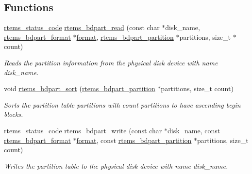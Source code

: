 \subsection*{Functions}
\begin{DoxyCompactItemize}
\item 
\mbox{\hyperlink{group__ClassicStatus_ga545d41846817eaba6143d52ee4d9e9fe}{rtems\+\_\+status\+\_\+code}} \mbox{\hyperlink{group__rtems__bdpart_ga1ffdc1b7fc86d324faa9b93500ab0e63}{rtems\+\_\+bdpart\+\_\+read}} (const char $\ast$disk\+\_\+name, \mbox{\hyperlink{unionrtems__bdpart__format}{rtems\+\_\+bdpart\+\_\+format}} $\ast$\mbox{\hyperlink{structformat}{format}}, \mbox{\hyperlink{structrtems__bdpart__partition}{rtems\+\_\+bdpart\+\_\+partition}} $\ast$partitions, size\+\_\+t $\ast$count)
\begin{DoxyCompactList}\small\item\em Reads the partition information from the physical disk device with name {\itshape disk\+\_\+name}. \end{DoxyCompactList}\item 
\mbox{\label{group__rtems__bdpart_gaec68d844510e8516ae962f29d1cdd384}} 
void \mbox{\hyperlink{group__rtems__bdpart_gaec68d844510e8516ae962f29d1cdd384}{rtems\+\_\+bdpart\+\_\+sort}} (\mbox{\hyperlink{structrtems__bdpart__partition}{rtems\+\_\+bdpart\+\_\+partition}} $\ast$partitions, size\+\_\+t count)
\begin{DoxyCompactList}\small\item\em Sorts the partition table {\itshape partitions} with {\itshape count} partitions to have ascending begin blocks. \end{DoxyCompactList}\item 
\mbox{\hyperlink{group__ClassicStatus_ga545d41846817eaba6143d52ee4d9e9fe}{rtems\+\_\+status\+\_\+code}} \mbox{\hyperlink{group__rtems__bdpart_gaa8b69004c352fe7867bdcb551453beb0}{rtems\+\_\+bdpart\+\_\+write}} (const char $\ast$disk\+\_\+name, const \mbox{\hyperlink{unionrtems__bdpart__format}{rtems\+\_\+bdpart\+\_\+format}} $\ast$\mbox{\hyperlink{structformat}{format}}, const \mbox{\hyperlink{structrtems__bdpart__partition}{rtems\+\_\+bdpart\+\_\+partition}} $\ast$partitions, size\+\_\+t count)
\begin{DoxyCompactList}\small\item\em Writes the partition table to the physical disk device with name {\itshape disk\+\_\+name}. \end{DoxyCompactList}\item 

\end{DoxyCompactItemize}
